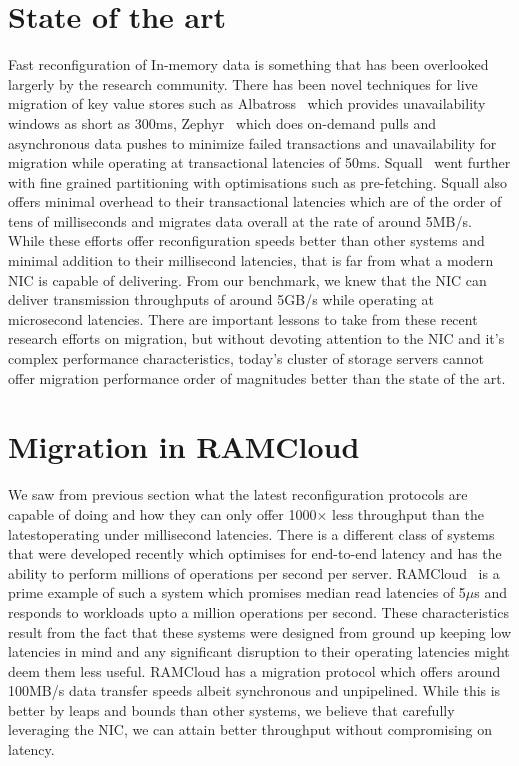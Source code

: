 \section{State of the art}
Fast reconfiguration of In-memory data is something that has been overlooked largerly
by the research community. There has been novel techniques for live migration of 
key value stores such as Albatross~\cite{albatross} which provides unavailability windows 
as short as 300ms, Zephyr~\cite{zephyr} which does on-demand pulls and asynchronous data 
pushes to minimize failed transactions and unavailability for migration while operating 
at transactional latencies of 50ms. Squall~\cite{squall} went further with fine grained 
partitioning with optimisations such as pre-fetching. Squall also offers minimal overhead 
to their transactional latencies which are of the order of tens of milliseconds and migrates 
data overall at the rate of around 5MB/s. While these efforts offer reconfiguration speeds 
better than other systems and minimal addition to their millisecond latencies, that is far 
from what a modern NIC is capable of delivering. From our benchmark, we knew that the NIC 
can deliver transmission throughputs of around 5GB/s while operating at microsecond latencies. 
There are important lessons to take from these recent research efforts on migration, but without 
devoting attention to the NIC and it's complex performance characteristics, today's cluster of
storage servers cannot offer migration performance order of magnitudes better than the state of the art.

\section{Migration in RAMCloud}
We saw from previous section what the latest reconfiguration protocols are capable of doing and how they can only 
offer 1000$\times$ less throughput than the latestoperating under millisecond latencies. There is a different class of systems~\cite{ramcloud,farm,rdmabillion,herd} that 
were developed recently which optimises for end-to-end latency and has the ability to perform millions of operations 
per second per server. RAMCloud~\cite{ramcloud} is a prime example of such a system which promises median read latencies 
of 5$\mu$s and responds to workloads upto a million operations per second. These characteristics result from the fact that 
these systems were designed from ground up keeping low latencies in mind and any significant disruption to their operating 
latencies might deem them less useful. RAMCloud has a migration protocol which offers around 100MB/s data transfer speeds albeit 
synchronous and unpipelined. While this is better by leaps and bounds than other systems, we believe that carefully leveraging the NIC, 
we can attain better throughput without compromising on latency.

